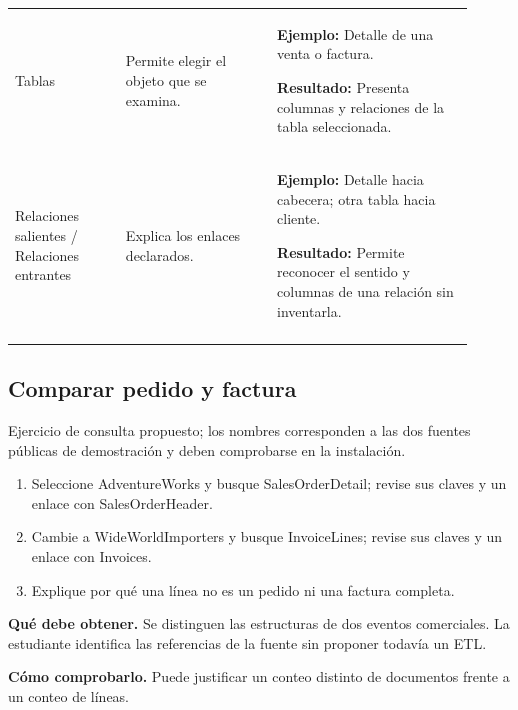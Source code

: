 \begin{longtable}{@{}>{\RaggedRight\arraybackslash}p{0.22\linewidth}>{\RaggedRight\arraybackslash}p{0.3\linewidth}>{\RaggedRight\arraybackslash}p{0.39\linewidth}@{}}
\addlinespace[3pt]
Tablas & Permite elegir el objeto que se examina. & \textbf{Ejemplo:} Detalle de una venta o factura.\par\smallskip\textbf{Resultado:} Presenta columnas y relaciones de la tabla seleccionada. \\
\addlinespace[3pt]
Relaciones salientes / Relaciones entrantes & Explica los enlaces declarados. & \textbf{Ejemplo:} Detalle hacia cabecera; otra tabla hacia cliente.\par\smallskip\textbf{Resultado:} Permite reconocer el sentido y columnas de una relación sin inventarla. \\
\addlinespace[3pt]
\end{longtable}
\endgroup

\subsection{Comparar pedido y factura}
Ejercicio de consulta propuesto; los nombres corresponden a las dos fuentes públicas de demostración y deben comprobarse en la instalación.

\begin{enumerate}
\item Seleccione AdventureWorks y busque SalesOrderDetail; revise sus claves y un enlace con SalesOrderHeader.
\item Cambie a WideWorldImporters y busque InvoiceLines; revise sus claves y un enlace con Invoices.
\item Explique por qué una línea no es un pedido ni una factura completa.
\end{enumerate}

\textbf{Qué debe obtener.} Se distinguen las estructuras de dos eventos comerciales. La estudiante identifica las referencias de la fuente sin proponer todavía un ETL.

\textbf{Cómo comprobarlo.} Puede justificar un conteo distinto de documentos frente a un conteo de líneas.

